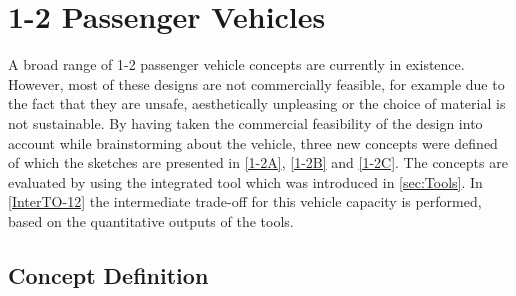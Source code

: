 \section{1-2 Passenger Vehicles}
\label{sc:1-2}
A broad range of 1-2 passenger vehicle concepts are currently in existence. However, most of these designs are not commercially feasible, for example due to the fact that they are unsafe, aesthetically unpleasing or the choice of material is not sustainable. By having taken the commercial feasibility of the design into account while brainstorming about the vehicle, three new concepts were defined of which the sketches are presented in \autoref{1-2A}, \autoref{1-2B} and \autoref{1-2C}. The concepts are evaluated by using the integrated tool which was introduced in \autoref{sec:Tools}. In \autoref{InterTO-12} the intermediate trade-off for this vehicle capacity is performed, based on the quantitative outputs of the tools.  


\subsection{Concept Definition}
\label{1-2Concepts}


